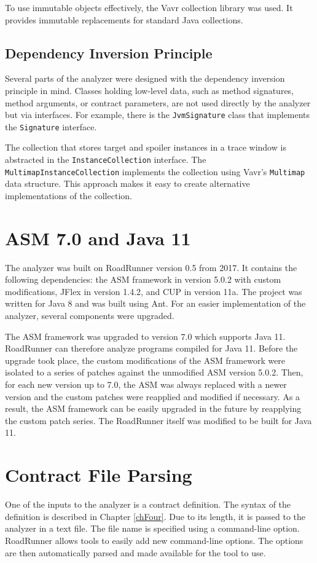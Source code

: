 To use immutable objects effectively, the Vavr collection library was used. It
provides immutable replacements for standard Java collections.

\subsection{Dependency Inversion Principle}
Several parts of the analyzer were designed with the dependency inversion
principle in mind. Classes holding low-level data, such as method signatures,
method arguments, or contract parameters, are not used directly by the analyzer
but via interfaces. For example, there is the \texttt{JvmSignature} class that
implements the \texttt{Signature} interface.

The collection that stores target and spoiler instances in a trace window is
abstracted in the \texttt{InstanceCollection} interface. The
\texttt{MultimapInstanceCollection} implements the collection using Vavr's
\texttt{Multimap} data structure. This approach makes it easy to create
alternative implementations of the collection.

\section{ASM 7.0 and Java 11}
\label{asmAndJava}
The analyzer was built on RoadRunner version 0.5 from 2017. It contains the
following dependencies: the ASM framework in version 5.0.2 with custom
modifications, JFlex in version 1.4.2, and CUP in version 11a. The project was
written for Java 8 and was built using Ant. For an easier implementation of the
analyzer, several components were upgraded.

The ASM framework was upgraded to version 7.0 which supports Java 11. RoadRunner
can therefore analyze programs compiled for Java 11. Before the upgrade took
place, the custom modifications of the ASM framework were isolated to a series
of patches against the unmodified ASM version 5.0.2. Then, for each new version
up to 7.0, the ASM was always replaced with a newer version and the custom
patches were reapplied and modified if necessary. As a result, the ASM framework
can be easily upgraded in the future by reapplying the custom patch series. The
RoadRunner itself was modified to be built for Java 11.

\section{Contract File Parsing}
\label{cfParsing}
One of the inputs to the analyzer is a contract definition. The syntax of the
definition is described in Chapter \ref{chFour}. Due to its length, it is passed
to the analyzer in a text file. The file name is specified using a command-line
option. RoadRunner allows tools to easily add new command-line options. The
options are then automatically parsed and made available for the tool to use.


